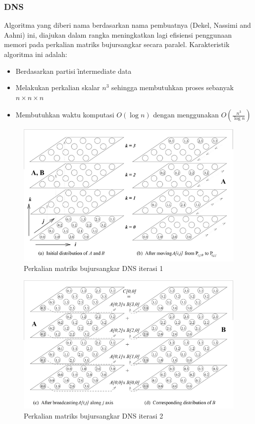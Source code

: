 \subsubsection{DNS}

Algoritma yang diberi nama berdasarkan nama pembuatnya (Dekel, Nassimi and Aahni) ini, diajukan dalam rangka meningkatkan lagi efisiensi penggunaan memori pada perkalian matriks bujursangkar secara paralel. Karakteristik algoritma ini adalah:
\begin{itemize}
	\item Berdasarkan partisi \f{intermediate data}
	\item Melakukan perkalian skalar $n^3$ sehingga membutuhkan proses sebanyak $n \times n \times n$
	\item Membutuhkan waktu komputasi $O(\log n)$ dengan menggunakan $O(\frac{n^3}{\log n})$
\end{itemize}

\begin{figure}
	\centering
	\includegraphics[width=1\textwidth]
	{pics/mm_dns1}
	\caption{Perkalian matriks bujursangkar DNS iterasi 1}
	\label{fig:mm_dns1}
\end{figure}

\begin{figure}
	\centering
	\includegraphics[width=1\textwidth]
	{pics/mm_dns2}
	\caption{Perkalian matriks bujursangkar DNS iterasi 2}
	\label{fig:mm_dns2}
\end{figure}


